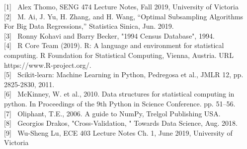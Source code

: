 \documentclass{article}
\begin{document}
[1]  $\>$ Alex Thomo, SENG 474 Lecture Notes, Fall 2019, University of Victoria\\

[2]  $\>$ M. Ai, J. Yu, H. Zhang, and H. Wang, “Optimal Subsampling Algorithms For Big Data Regressions,” Statistica Sinica, Jun. 2019.\\

[3] $\>$ Ronny Kohavi and Barry Becker, "1994 Census Database", 1994.\\

[4]  $\>$ R Core Team (2019). R: A language and environment for statistical computing. R Foundation for Statistical Computing, Vienna, Austria. URL https://www.R-project.org/.\\

[5] $\>$ Scikit-learn: Machine Learning in Python, Pedregosa et al., JMLR 12, pp. 2825-2830, 2011.\\

[6] $\>$ McKinney, W. et al., 2010. Data structures for statistical computing in python. In Proceedings of the 9th Python in Science Conference. pp. 51–56.\\

[7] $\>$ Oliphant, T.E., 2006. A guide to NumPy, Trelgol Publishing USA.\\

[8] $\>$ Georgios Drakos, "Cross-Validation, " Towards Data Science, Aug. 2018.\\




[9] $\>$ Wu-Sheng Lu, ECE 403 Lecture Notes Ch. 1, June 2019, University of Victoria\\
\end{document}

